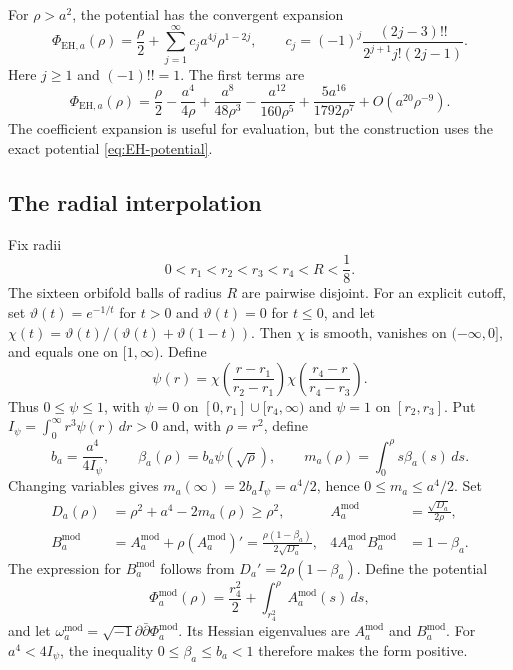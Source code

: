 \documentclass[11pt,a4paper,twoside]{article}
\numberwithin{equation}{section}
\theoremstyle{definition}
\theoremstyle{remark}
\newcommand{\ii}{\sqrt{-1}}
\begin{document}
For \(\rho>a^2\), the potential has the convergent expansion
\begin{equation}\label{eq:EH-asymptotic-series}
\Phi_{\mathrm{EH},a}(\rho)
=\frac{\rho}{2}+\sum_{j=1}^{\infty}c_ja^{4j}\rho^{1-2j},
\qquad c_j=(-1)^j\frac{(2j-3)!!}{2^{j+1}j!(2j-1)}.
\end{equation}
Here \(j\ge1\) and \((-1)!!=1\). The first terms are
\[
\Phi_{\mathrm{EH},a}(\rho)
=\frac{\rho}{2}-\frac{a^4}{4\rho}
+\frac{a^8}{48\rho^3}-\frac{a^{12}}{160\rho^5}
+\frac{5a^{16}}{1792\rho^7}+O(a^{20}\rho^{-9}).
\]
The coefficient expansion is useful for evaluation, but the
construction uses the exact potential \eqref{eq:EH-potential}.

\subsection{The radial interpolation}
\label{subsec:radial-interpolation}
Fix radii
\begin{equation}\label{eq:fixed-radii}
0<r_1<r_2<r_3<r_4<R<\frac18.
\end{equation}
The sixteen orbifold balls of radius \(R\) are pairwise disjoint.
For an explicit cutoff, set \(\vartheta(t)=e^{-1/t}\) for
\(t>0\) and \(\vartheta(t)=0\) for \(t\le0\), and let
\(\chi(t)=\vartheta(t)/(\vartheta(t)+\vartheta(1-t))\).
Then \(\chi\) is smooth, vanishes on \((-\infty,0]\), and
equals one on \([1,\infty)\). Define
\[
\psi(r)=\chi\!\left(\frac{r-r_1}{r_2-r_1}\right)
\chi\!\left(\frac{r_4-r}{r_4-r_3}\right).
\]
Thus \(0\le\psi\le1\), with \(\psi=0\) on
\([0,r_1]\cup[r_4,\infty)\) and \(\psi=1\) on
\([r_2,r_3]\). Put \(I_\psi=\int_0^\infty r^3\psi(r)\,dr>0\)
and, with \(\rho=r^2\), define
\begin{equation}\label{eq:radial-density}
b_a=\frac{a^4}{4I_\psi},\qquad
\beta_a(\rho)=b_a\psi(\sqrt\rho),\qquad
m_a(\rho)=\int_0^\rho s\beta_a(s)\,ds.
\end{equation}
Changing variables gives \(m_a(\infty)=2b_aI_\psi=a^4/2\),
hence \(0\le m_a\le a^4/2\). Set
\begin{equation}\label{eq:radial-coefficients}
\begin{aligned}
D_a(\rho)&=\rho^2+a^4-2m_a(\rho)\ge\rho^2,
& A_a^{\mathrm{mod}}&=\frac{\sqrt{D_a}}{2\rho},\\
B_a^{\mathrm{mod}}&=A_a^{\mathrm{mod}}
+\rho(A_a^{\mathrm{mod}})'
=\frac{\rho(1-\beta_a)}{2\sqrt{D_a}},
&4A_a^{\mathrm{mod}}B_a^{\mathrm{mod}}&=1-\beta_a.
\end{aligned}
\end{equation}
The expression for \(B_a^{\mathrm{mod}}\) follows from
\(D_a'=2\rho(1-\beta_a)\). Define the potential
\[
\Phi_a^{\mathrm{mod}}(\rho)
=\frac{r_4^2}{2}+\int_{r_4^2}^{\rho}A_a^{\mathrm{mod}}(s)\,ds,
\]
and let \(\omega_a^{\mathrm{mod}}=\ii\partial\bar\partial
\Phi_a^{\mathrm{mod}}\). Its Hessian eigenvalues are
\(A_a^{\mathrm{mod}}\) and \(B_a^{\mathrm{mod}}\).
For \(a^4<4I_\psi\), the inequality \(0\le\beta_a\le b_a<1\)
therefore makes the form positive.
\end{document}
